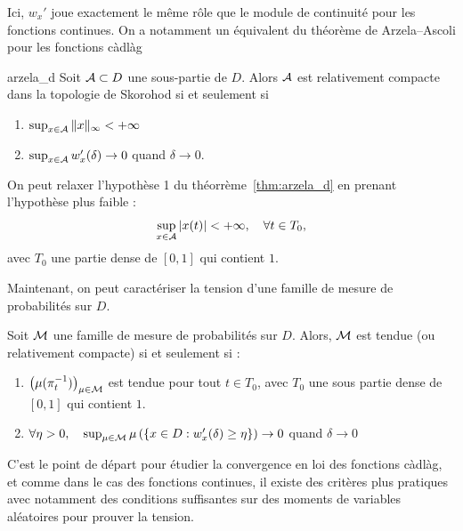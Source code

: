 Ici, $w_x'$ joue exactement le même rôle que le module de continuité pour les fonctions continues. On a notamment un équivalent du théorème de Arzela--Ascoli pour les fonctions
càdlàg
\begin{thm}{}{arzela_d}
	Soit $\mathcal{A} \subset D$ une sous-partie de $D$. Alors $\mathcal{A}$ est relativement compacte dans la topologie de Skorohod si et seulement si
	\begin{enumerate}
		\item $\sup_{x \in \mathcal{A}} \|x\|_\infty < +\infty$
		\item $\sup_{x\in \mathcal{A}} w_x'(\delta) \to 0$ quand $\delta \to 0$.
	\end{enumerate}
\end{thm}

\begin{rem}
	On peut relaxer l'hypothèse 1 du théorrème~\ref{thm:arzela_d} en prenant l'hypothèse plus faible :
	\[
		\sup_{x \in \mathcal{A}} |x(t)| < +\infty, \quad \forall t \in T_0,
	\]
	avec $T_0$ une partie dense de $[0,1]$ qui contient $1$.
\end{rem}

Maintenant, on peut caractériser la tension d'une famille de mesure de probabilités sur $D$.
\begin{thm}{}{}
	Soit $\mathcal{M}$ une famille de mesure de probabilités sur $D$. Alors, $\mathcal{M}$ est tendue (ou relativement compacte) si et seulement si :
	\begin{enumerate}
		\item $\left(\mu(\pi_t^{-1})\right)_{\mu \in \mathcal{M}}$ est tendue pour tout $t \in T_0$, avec $T_0$ une sous partie dense de $[0,1]$ qui contient $1$.
		\item $\forall \eta > 0, \quad \sup_{\mu \in \mathcal{M}} \mu \left(\{x \in D : w_x'(\delta) \ge \eta \}\right) \to 0$ quand $\delta \to 0$
	\end{enumerate}
\end{thm}

C'est le point de départ pour étudier la convergence en loi des fonctions càdlàg, et comme dans le cas des fonctions  continues, il existe des critères plus pratiques avec notamment des conditions suffisantes sur des moments de variables aléatoires pour prouver la tension.
